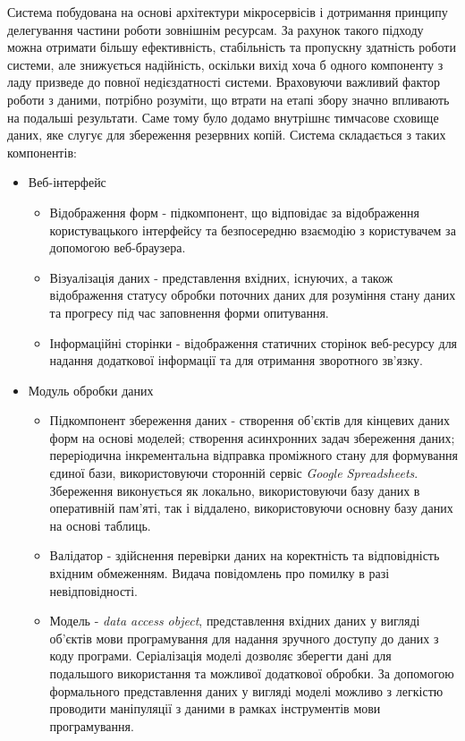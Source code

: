 Система побудована на основі архітектури мікросервісів і дотримання принципу делегування частини роботи зовнішнім ресурсам. За рахунок такого підходу можна отримати більшу ефективність, стабільність та пропускну здатність роботи системи, але знижується надійність, оскільки вихід хоча б одного компоненту з ладу призведе до повної недієздатності системи. Враховуючи важливий фактор роботи з даними, потрібно розуміти, що втрати на етапі збору значно впливають на подальші результати. Саме тому було додамо внутрішнє тимчасове сховище даних, яке слугує для збереження резервних копій. Система складається з таких компонентів:
\begin{itemize}
	\item Веб-інтерфейс
	\begin{itemize}
		\item Відображення форм - підкомпонент, що відповідає за відображення користувацького інтерфейсу та безпосередню взаємодію з користувачем за допомогою веб-браузера.
		\item Візуалізація даних - представлення вхідних, існуючих, а також відображення статусу обробки поточних даних для розуміння стану даних та прогресу під час заповнення форми опитування.
		\item Інформаційні сторінки - відображення статичних сторінок веб-ресурсу для надання додаткової інформації та для отримання зворотного зв'язку.
	\end{itemize}
	\item Модуль обробки даних
	\begin{itemize}
		\item Підкомпонент збереження даних - створення об'єктів для кінцевих даних форм на основі моделей; створення асинхронних задач збереження даних; переріодична інкрементальна відправка проміжного стану для формування єдиної бази, використовуючи сторонній сервіс \textit{Google Spreadsheets}. Збереження виконується як локально, використовуючи базу даних в оперативній пам'яті, так і віддалено, використовуючи основну базу даних на основі таблиць.
		\item Валідатор - здійснення перевірки даних на коректність та відповідність вхідним обмеженням. Видача повідомлень про помилку в разі невідповідності.
		\item Модель - \textit{data access object}, представлення вхідних даних у вигляді об'єктів мови програмування для надання зручного доступу до даних з коду програми. Серіалізація моделі дозволяє зберегти дані для подальшого використання та можливої додаткової обробки. За допомогою формального представлення даних у вигляді моделі можливо з легкістю проводити маніпуляції з даними в рамках інструментів мови програмування.
	\end{itemize}
\end{itemize}

